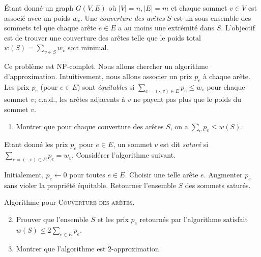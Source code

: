 \documentclass[12pt]{article}
\begin{document}
Étant donné un graph $G(V,E)$ où $|V| = n, |E| = m$ 
et chaque sommet $v \in V$ est associé avec un poids $w_{v}$.
Une \emph{couverture des arêtes} $S$ est un sous-ensemble des sommets tel que
chaque arête $e \in E$ a au moins une extrémité dans $S$.
L'objectif est de trouver une couverture des arêtes telle que le poids total 
$w(S) = \sum_{v \in S} w_{v}$ soit minimal.
%

Ce problème est NP-complet. Nous allons chercher un algorithme d'approximation.
Intuitivement, nous allons associer un prix $p_{e}$ à chaque arête. Les prix $p_{e}$ (pour $e \in E$) sont 
\emph{équitables} si $\sum_{e = (\cdot,v) \in E} p_{e} \leq w_{v}$ pour chaque sommet $v$; c.a.d., 
les arêtes adjacents à $v$ ne payent pas plus que le poids du sommet $v$. 

\begin{enumerate}
	\item Montrer que pour chaque couverture des arêtes $S$, on a $\sum_{e} p_{e} \leq w(S)$.
\end{enumerate}

 Etant donné les prix $p_{e}$ pour $e \in E$, 
		un sommet $v$ est dit \emph{saturé} si $\sum_{e = (\cdot,v) \in E} p_{e} = w_{v}$.
		Considérer l'algorithme suivant.
		
\begin{algorithm}[ht]
\begin{algorithmic}[1]  
\STATE Initialement, $p_{e} \gets 0$ pour toutes $e \in E$. 
	\STATE Choisir une telle arête $e$.
	\STATE Augmenter $p_{e}$ sans violer la propriété équitable.
\ENDWHILE
\STATE Retourner l'ensemble $S$ des sommets saturés.
\end{algorithmic}
\caption{Algorithme pour \textsc{Couverture des arêtes}.}
\label{algo:covering}
\end{algorithm}

\begin{enumerate}
	\setcounter{enumi}{1}
	\item Prouver que l'ensemble $S$ et les prix $p_{e}$ retournés par l'algorithme satisfait $w(S) \leq 2 \sum_{e \in E} p_{e}$.
	\item Montrer que l'algorithme est 2-approximation.
\end{enumerate}
\end{document}
